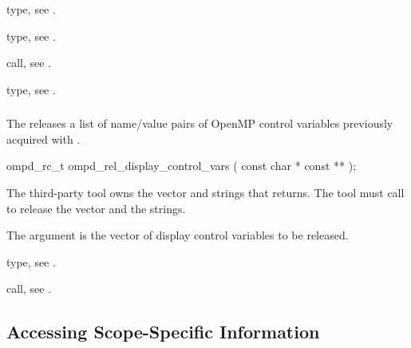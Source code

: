\begin{crossrefs}
\item {} type, 
see .

\item {} type, see .

\item {} call, see .

\item {} type, 
see .
\end{crossrefs}



\subsubsection{}
\label{subsubsubsec:ompd_rel_display_control_vars}

\summary
The  releases a list of name/value pairs 
of OpenMP control variables previously acquired with 
.

\format
\begin{cspecific}
\begin{ompSyntax}
ompd_rc_t ompd_rel_display_control_vars (
  const char * const **
);
\end{ompSyntax}
\end{cspecific}

\descr
The third-party tool owns the vector and strings that 
 returns. The tool must call
 to release the vector and the strings.

\argdesc
The  argument is the vector of display control variables 
to be released.

\begin{crossrefs}
 \item {} type, see .

\item {} call, 
see .
\end{crossrefs}



\subsection{Accessing Scope-Specific Information}



